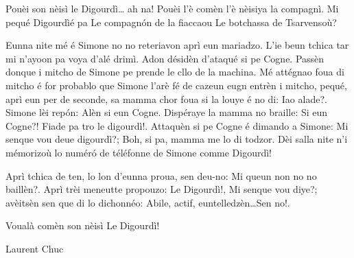 {Pouèi son nèisì le Digourdì… ah na! Pouèi l'è comèn l'è nèisiya la compagnì. Mi pequé \og Digourdì\fg é pa \og Le compagn\'on de la fiacca\fg ou \og Le botchassa de Tsarvensoù\fg?

Eunna nite mé é Simone no no reteriavon aprì eun mariadzo. L'ie beun tchica tar mi n'ayoon pa voya d'alé drimì. Adon désidèn d'ataqué si pe Cogne. Passèn donque i mitcho de Simone pe prende le cllo de la machina. Mé attégnao foua di mitcho é for probablo que Simone l'arè fé de cazeun eugn entrèn i mitcho, pequé, aprì eun per de seconde, sa mamma chor foua si la louye é no di: \og Iao alade?\fg. Simone lèi rep\'on: \og Alèn si eun Cogne\fg. Dispéraye la mamma no braille: \og Si eun Cogne?! Fiade pa tro le digourdì!\fg.
Attaquèn si pe Cogne é dimando a Simone: \og Mi senque vou deue digourdì?\fg; \og Boh, si pa, mamma me lo di todzor\fg. Dèi salla nite n'i mémorizoù lo numér\'o de téléfonne de Simone comme \og Digourdì\fg!

Aprì tchica de ten, lo lon d'eunna proua, sen deu-no: \og Mi queun non no no baillèn?\fg. Aprì trèi meneutte propouzo: \og Le Digourdì!\fg, \og Mi senque vou diye?\fg; avèitsèn sen que di lo dichonnéo: \og Abile, actif, euntelledzèn\fg\ldots \og Sen no!\fg.

Voualà comèn son nèisì Le Digourdì!}{Laurent Chuc}
